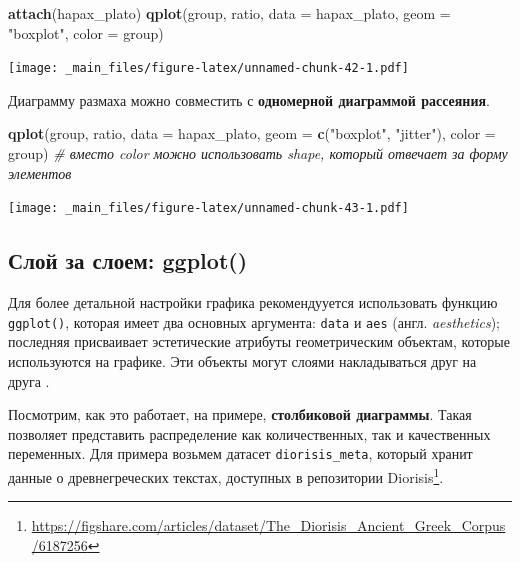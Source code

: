 \documentclass[
]{book}
\newenvironment{Shaded}{\begin{snugshade}}{\end{snugshade}}
\newcommand{\AttributeTok}[1]{\textcolor[rgb]{0.13,0.29,0.53}{#1}}
\newcommand{\CommentTok}[1]{\textcolor[rgb]{0.56,0.35,0.01}{\textit{#1}}}
\newcommand{\FunctionTok}[1]{\textcolor[rgb]{0.13,0.29,0.53}{\textbf{#1}}}
\newcommand{\NormalTok}[1]{#1}
\newcommand{\StringTok}[1]{\textcolor[rgb]{0.31,0.60,0.02}{#1}}
\theoremstyle{definition}
\theoremstyle{definition}
\theoremstyle{definition}
\theoremstyle{definition}
\theoremstyle{remark}
\begin{document}
\begin{Shaded}
\begin{Highlighting}[]
\FunctionTok{attach}\NormalTok{(hapax\_plato)}
\FunctionTok{qplot}\NormalTok{(group, ratio, }\AttributeTok{data =}\NormalTok{ hapax\_plato, }\AttributeTok{geom =} \StringTok{"boxplot"}\NormalTok{, }\AttributeTok{color =}\NormalTok{ group)}
\end{Highlighting}
\end{Shaded}

\texttt{[image: \_main\_files/figure-latex/unnamed-chunk-42-1.pdf]}

Диаграмму размаха можно совместить с \textbf{одномерной диаграммой рассеяния}.

\begin{Shaded}
\begin{Highlighting}[]
\FunctionTok{qplot}\NormalTok{(group, ratio, }\AttributeTok{data =}\NormalTok{ hapax\_plato, }\AttributeTok{geom =} \FunctionTok{c}\NormalTok{(}\StringTok{"boxplot"}\NormalTok{, }\StringTok{"jitter"}\NormalTok{), }\AttributeTok{color =}\NormalTok{ group) }\CommentTok{\# вместо color можно использовать shape, который отвечает за форму элементов}
\end{Highlighting}
\end{Shaded}

\texttt{[image: \_main\_files/figure-latex/unnamed-chunk-43-1.pdf]}

\hypertarget{ux441ux43bux43eux439-ux437ux430-ux441ux43bux43eux435ux43c-ggplot}{%
\subsection{Слой за слоем: ggplot()}\label{ux441ux43bux43eux439-ux437ux430-ux441ux43bux43eux435ux43c-ggplot}}

Для более детальной настройки графика рекомендууется использовать функцию \texttt{ggplot()}, которая имеет два основных аргумента: \texttt{data} и \texttt{aes} (англ. \emph{aesthetics}); последняя присваивает эстетические атрибуты геометрическим объектам, которые используются на графике. Эти объекты могут слоями накладываться друг на друга \citep{wickham2016}.

Посмотрим, как это работает, на примере, \textbf{столбиковой диаграммы}. Такая позволяет представить распределение как количественных, так и качественных переменных. Для примера возьмем датасет \texttt{diorisis\_meta}, который хранит данные о древнегреческих текстах, доступных в репозитории Diorisis\footnote{\url{https://figshare.com/articles/dataset/The_Diorisis_Ancient_Greek_Corpus/6187256}}.
\end{document}
